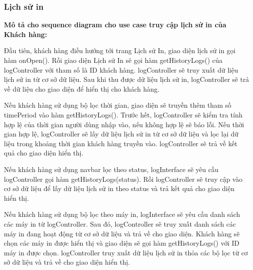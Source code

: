 \subsubsection{Lịch sử in}
\textbf{Mô tả cho sequence diagram cho use case truy cập lịch sử in của Khách hàng:}\par

Đầu tiên, khách hàng điều hướng tới trang Lịch sử In, giao diện lịch sử in gọi hàm onOpen(). Rồi giao diện Lịch sử In sẽ gọi hàm getHistoryLogs() của logController với tham số là ID khách hàng. logController sẽ truy xuất dữ liệu lịch sử in từ cơ sở dữ liệu. Sau khi thu được dữ liệu lịch sử in, logController sẽ trả về dữ liệu cho giao diện để hiển thị cho khách hàng. \par

Nếu khách hàng sử dụng bộ lọc thời gian, giao diện sẽ truyền thêm tham số timePeriod vào hàm getHistoryLogs(). Trước hết, logController sẽ kiểm tra tính hợp lệ của thời gian người dùng nhập vào, nếu không hợp lệ sẽ báo lỗi. Nếu thời gian hợp lệ, logController sẽ lấy dữ liệu lịch sử in từ cơ sở dữ liệu và lọc lại dữ liệu trong khoảng thời gian khách hàng truyền vào. logController sẽ trả về kết quả cho giao diện hiển thị. \par

Nếu khách hàng sử dụng navbar lọc theo status, logInterface sẽ yêu cầu logController gọi hàm getHistoryLogs(status). Rồi logController sẽ truy cập vào cơ sở dữ liệu để lấy dữ liệu lịch sử in theo status và trả kết quả cho giao diện hiển thị.\par

Nếu khách hàng sử dụng bộ lọc theo máy in, logInterface sẽ yêu cầu danh sách các máy in từ logController. Sau đó, logController sẽ truy xuất danh sách các máy in đang hoạt động từ cơ sở dữ liệu và trả về cho giao diện. Khách hàng sẽ chọn các máy in được hiển thị và giao diện sẽ gọi hàm getHistoryLogs() với ID máy in được chọn. logController truy xuất dữ liệu lịch sử in thỏa các bộ lọc từ cơ sở dữ liệu và trả về cho giao diện hiển thị.\par

